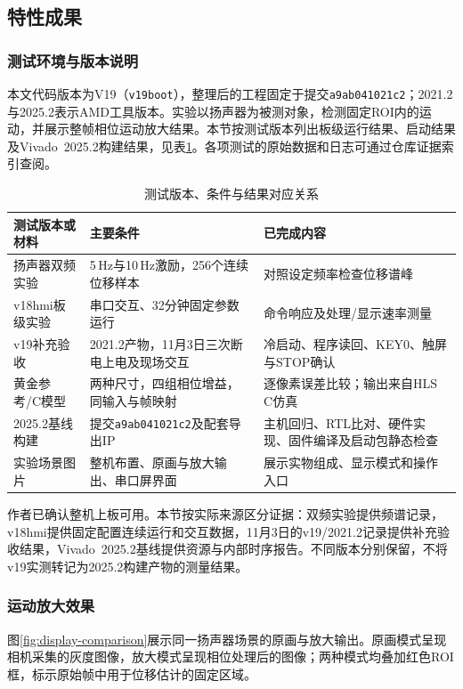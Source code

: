 \subsection{特性成果}
\subsubsection{测试环境与版本说明}
本文代码版本为V19（\texttt{v19boot}），整理后的工程固定于提交\texttt{a9ab041021c2}；2021.2与2025.2表示AMD工具版本。实验以扬声器为被测对象，检测固定ROI内的运动，并展示整帧相位运动放大结果。本节按测试版本列出板级运行结果、启动结果及Vivado~2025.2构建结果，见表\ref{tab:evidence-versions}。各项测试的原始数据和日志可通过仓库证据索引查阅\cite{repo}。

\begin{table}[htbp]
\centering\small
\caption{测试版本、条件与结果对应关系}\label{tab:evidence-versions}
\begin{tabularx}{\linewidth}{@{}p{2.7cm}p{3.2cm}X@{}}
\toprule
测试版本或材料 & 主要条件 & 已完成内容 \\
\midrule
扬声器双频实验 & 5\,Hz与10\,Hz激励，256个连续位移样本 & 对照设定频率检查位移谱峰 \\
v18hmi板级实验 & 串口交互、32分钟固定参数运行 & 命令响应及处理/显示速率测量 \\
v19补充验收 & 2021.2产物，11月3日三次断电上电及现场交互 & 冷启动、程序读回、KEY0、触屏与STOP确认 \\
黄金参考/C模型 & 两种尺寸，四组相位增益，同输入与帧映射 & 逐像素误差比较；输出来自HLS C仿真 \\
2025.2基线构建 & 提交\texttt{a9ab041021c2}及配套导出IP & 主机回归、RTL比对、硬件实现、固件编译及启动包静态检查 \\
实验场景图片 & 整机布置、原画与放大输出、串口屏界面 & 展示实物组成、显示模式和操作入口 \\
\bottomrule
\end{tabularx}
\end{table}

作者已确认整机上板可用。本节按实际来源区分证据：双频实验提供频谱记录，v18hmi提供固定配置连续运行和交互数据，11月3日的v19/2021.2记录提供补充验收结果，Vivado~2025.2基线提供资源与内部时序报告。不同版本分别保留，不将v19实测转记为2025.2构建产物的测量结果。

\subsubsection{运动放大效果}
图\ref{fig:display-comparison}展示同一扬声器场景的原画与放大输出。原画模式呈现相机采集的灰度图像，放大模式呈现相位处理后的图像；两种模式均叠加红色ROI框，标示原始帧中用于位移估计的固定区域。


